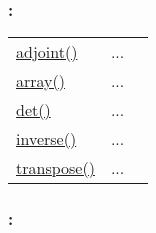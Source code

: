 \subsubsection*{: }

\textcolor{blue}{}\begin{tabular}{>{\raggedleft}p{3cm}>{\centering}p{0.5cm}l}
\textcolor{blue}{\hyperlink{adjoint}{adjoint()}}&
...&
 \begin{NoHyper} \nameref{par:Adjoint-matrix.} \end{NoHyper}\tabularnewline
\textcolor{blue}{\hyperlink{array}{array()}}&
...&
 \begin{NoHyper} \nameref{par:array} \end{NoHyper}\tabularnewline
\textcolor{blue}{\hyperlink{det}{det()}}&
...&
 \begin{NoHyper} \nameref{par:Determinant} \end{NoHyper}\tabularnewline
\textcolor{blue}{\hyperlink{inverse}{inverse()}}&
...&
 \begin{NoHyper} \nameref{par:Matrix-inverse} \end{NoHyper}\tabularnewline
\textcolor{blue}{\hyperlink{transpose}{transpose()}}&
...&
 \begin{NoHyper} \nameref{par:Matrix-transpose} \end{NoHyper}\tabularnewline
\end{tabular}


\subsubsection*{: }

